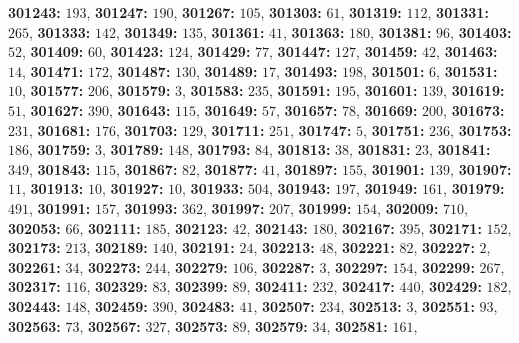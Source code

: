 \textsf{\bfseries 301243:} $193$, \textsf{\bfseries 301247:} $190$, \textsf{\bfseries 301267:} $105$, \textsf{\bfseries 301303:} $61$, \textsf{\bfseries 301319:} $112$, \textsf{\bfseries 301331:} $265$, \textsf{\bfseries 301333:} $142$, \textsf{\bfseries 301349:} $135$, \textsf{\bfseries 301361:} $41$, \textsf{\bfseries 301363:} $180$, \textsf{\bfseries 301381:} $96$, \textsf{\bfseries 301403:} $52$, \textsf{\bfseries 301409:} $60$, \textsf{\bfseries 301423:} $124$, \textsf{\bfseries 301429:} $77$, \textsf{\bfseries 301447:} $127$, \textsf{\bfseries 301459:} $42$, \textsf{\bfseries 301463:} $14$, \textsf{\bfseries 301471:} $172$, \textsf{\bfseries 301487:} $130$, \textsf{\bfseries 301489:} $17$, \textsf{\bfseries 301493:} $198$, \textsf{\bfseries 301501:} $6$, \textsf{\bfseries 301531:} $10$, \textsf{\bfseries 301577:} $206$, \textsf{\bfseries 301579:} $3$, \textsf{\bfseries 301583:} $235$, \textsf{\bfseries 301591:} $195$, \textsf{\bfseries 301601:} $139$, \textsf{\bfseries 301619:} $51$, \textsf{\bfseries 301627:} $390$, \textsf{\bfseries 301643:} $115$, \textsf{\bfseries 301649:} $57$, \textsf{\bfseries 301657:} $78$, \textsf{\bfseries 301669:} $200$, \textsf{\bfseries 301673:} $231$, \textsf{\bfseries 301681:} $176$, \textsf{\bfseries 301703:} $129$, \textsf{\bfseries 301711:} $251$, \textsf{\bfseries 301747:} $5$, \textsf{\bfseries 301751:} $236$, \textsf{\bfseries 301753:} $186$, \textsf{\bfseries 301759:} $3$, \textsf{\bfseries 301789:} $148$, \textsf{\bfseries 301793:} $84$, \textsf{\bfseries 301813:} $38$, \textsf{\bfseries 301831:} $23$, \textsf{\bfseries 301841:} $349$, \textsf{\bfseries 301843:} $115$, \textsf{\bfseries 301867:} $82$, \textsf{\bfseries 301877:} $41$, \textsf{\bfseries 301897:} $155$, \textsf{\bfseries 301901:} $139$, \textsf{\bfseries 301907:} $11$, \textsf{\bfseries 301913:} $10$, \textsf{\bfseries 301927:} $10$, \textsf{\bfseries 301933:} $504$, \textsf{\bfseries 301943:} $197$, \textsf{\bfseries 301949:} $161$, \textsf{\bfseries 301979:} $491$, \textsf{\bfseries 301991:} $157$, \textsf{\bfseries 301993:} $362$, \textsf{\bfseries 301997:} $207$, \textsf{\bfseries 301999:} $154$, \textsf{\bfseries 302009:} $710$, \textsf{\bfseries 302053:} $66$, \textsf{\bfseries 302111:} $185$, \textsf{\bfseries 302123:} $42$, \textsf{\bfseries 302143:} $180$, \textsf{\bfseries 302167:} $395$, \textsf{\bfseries 302171:} $152$, \textsf{\bfseries 302173:} $213$, \textsf{\bfseries 302189:} $140$, \textsf{\bfseries 302191:} $24$, \textsf{\bfseries 302213:} $48$, \textsf{\bfseries 302221:} $82$, \textsf{\bfseries 302227:} $2$, \textsf{\bfseries 302261:} $34$, \textsf{\bfseries 302273:} $244$, \textsf{\bfseries 302279:} $106$, \textsf{\bfseries 302287:} $3$, \textsf{\bfseries 302297:} $154$, \textsf{\bfseries 302299:} $267$, \textsf{\bfseries 302317:} $116$, \textsf{\bfseries 302329:} $83$, \textsf{\bfseries 302399:} $89$, \textsf{\bfseries 302411:} $232$, \textsf{\bfseries 302417:} $440$, \textsf{\bfseries 302429:} $182$, \textsf{\bfseries 302443:} $148$, \textsf{\bfseries 302459:} $390$, \textsf{\bfseries 302483:} $41$, \textsf{\bfseries 302507:} $234$, \textsf{\bfseries 302513:} $3$, \textsf{\bfseries 302551:} $93$, \textsf{\bfseries 302563:} $73$, \textsf{\bfseries 302567:} $327$, \textsf{\bfseries 302573:} $89$, \textsf{\bfseries 302579:} $34$, \textsf{\bfseries 302581:} $161$, 
